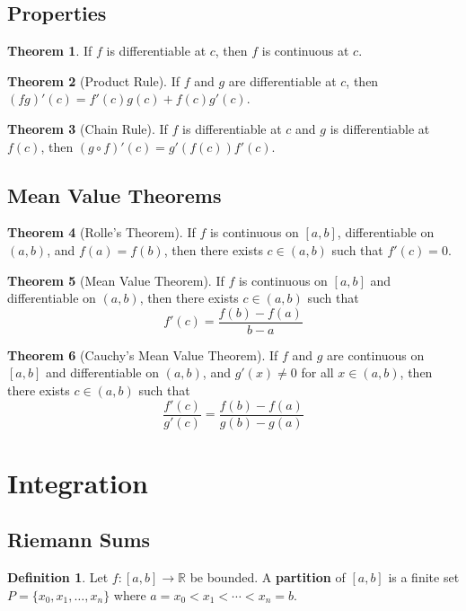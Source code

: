 \documentclass[11pt]{article}
\theoremstyle{definition}
\newtheorem{definition}{Definition}[section]
\newtheorem{theorem}{Theorem}[section]
\begin{document}
\subsection{Properties}
\begin{theorem}
If $f$ is differentiable at $c$, then $f$ is continuous at $c$.
\end{theorem}

\begin{theorem}[Product Rule]
If $f$ and $g$ are differentiable at $c$, then $(fg)'(c) = f'(c)g(c) + f(c)g'(c)$.
\end{theorem}

\begin{theorem}[Chain Rule]
If $f$ is differentiable at $c$ and $g$ is differentiable at $f(c)$, then $(g \circ f)'(c) = g'(f(c))f'(c)$.
\end{theorem}

\subsection{Mean Value Theorems}
\begin{theorem}[Rolle's Theorem]
If $f$ is continuous on $[a,b]$, differentiable on $(a,b)$, and $f(a) = f(b)$, then there exists $c \in (a,b)$ such that $f'(c) = 0$.
\end{theorem}

\begin{theorem}[Mean Value Theorem]
If $f$ is continuous on $[a,b]$ and differentiable on $(a,b)$, then there exists $c \in (a,b)$ such that
$$f'(c) = \frac{f(b) - f(a)}{b - a}$$
\end{theorem}

\begin{theorem}[Cauchy's Mean Value Theorem]
If $f$ and $g$ are continuous on $[a,b]$ and differentiable on $(a,b)$, and $g'(x) \neq 0$ for all $x \in (a,b)$, then there exists $c \in (a,b)$ such that
$$\frac{f'(c)}{g'(c)} = \frac{f(b) - f(a)}{g(b) - g(a)}$$
\end{theorem}

\section{Integration}

\subsection{Riemann Sums}
\begin{definition}
Let $f: [a,b] \to \mathbb{R}$ be bounded. A \textbf{partition} of $[a,b]$ is a finite set $P = \{x_0, x_1, \ldots, x_n\}$ where $a = x_0 < x_1 < \cdots < x_n = b$.
\end{definition}
\end{document}
